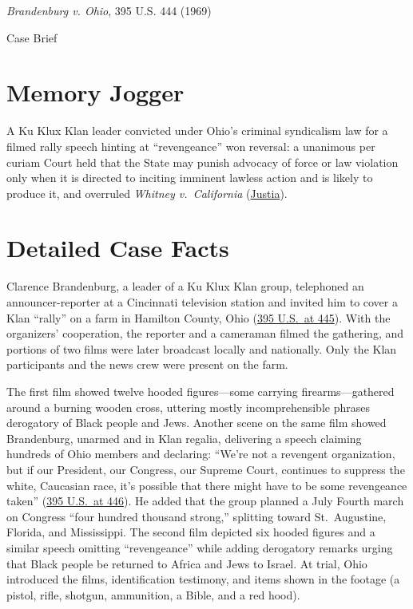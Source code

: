 \documentclass[12pt]{article}
\begin{document}
\begin{center}
{\LARGE \textit{Brandenburg v. Ohio}, 395 U.S. 444 (1969)\par}
\vspace{0.8em}
{\large Case Brief\par}
\end{center}
\vspace{1em}

\section{Memory Jogger}
A Ku Klux Klan leader convicted under Ohio's criminal syndicalism law for a filmed rally speech hinting at ``revengeance'' won reversal: a unanimous per curiam Court held that the State may punish advocacy of force or law violation only when it is directed to inciting imminent lawless action and is likely to produce it, and overruled \textit{Whitney v.\ California} (\href{https://supreme.justia.com/cases/federal/us/395/444/}{Justia}).

\section{Detailed Case Facts}
Clarence Brandenburg, a leader of a Ku Klux Klan group, telephoned an announcer-reporter at a Cincinnati television station and invited him to cover a Klan ``rally'' on a farm in Hamilton County, Ohio (\href{https://supreme.justia.com/cases/federal/us/395/444/}{395 U.S.\ at 445}). With the organizers' cooperation, the reporter and a cameraman filmed the gathering, and portions of two films were later broadcast locally and nationally. Only the Klan participants and the news crew were present on the farm.

The first film showed twelve hooded figures---some carrying firearms---gathered around a burning wooden cross, uttering mostly incomprehensible phrases derogatory of Black people and Jews. Another scene on the same film showed Brandenburg, unarmed and in Klan regalia, delivering a speech claiming hundreds of Ohio members and declaring: ``We're not a revengent organization, but if our President, our Congress, our Supreme Court, continues to suppress the white, Caucasian race, it's possible that there might have to be some revengeance taken'' (\href{https://supreme.justia.com/cases/federal/us/395/444/}{395 U.S.\ at 446}). He added that the group planned a July Fourth march on Congress ``four hundred thousand strong,'' splitting toward St.\ Augustine, Florida, and Mississippi. The second film depicted six hooded figures and a similar speech omitting ``revengeance'' while adding derogatory remarks urging that Black people be returned to Africa and Jews to Israel. At trial, Ohio introduced the films, identification testimony, and items shown in the footage (a pistol, rifle, shotgun, ammunition, a Bible, and a red hood).
\end{document}
